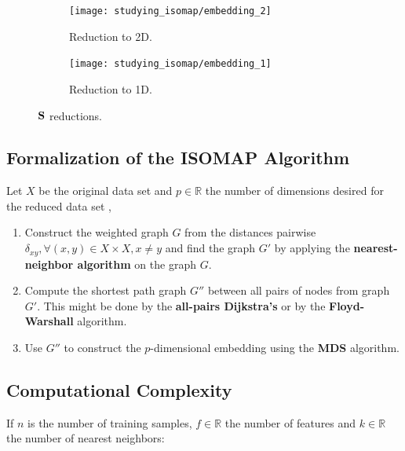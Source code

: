 \begin{figure}[H]
    \begin{subfigure}{.5\linewidth}
		\centering
		\captionsetup{justification=centering}
		\texttt{[image: studying\_isomap/embedding\_2]}
		\caption{Reduction to 2D.}
		\label{fig:mani_s_reduced_1}
	\end{subfigure}%
	\begin{subfigure}{.5\linewidth}
		\centering
		\captionsetup{justification=centering}
		\texttt{[image: studying\_isomap/embedding\_1]}
		\caption{Reduction to 1D.}
		\label{fig:mani_s_reduced_2}
	\end{subfigure}
	\caption{$\mathbf{S}$ reductions.}
	\label{fig:mani_s_reduced}
\end{figure}

\newpage
\subsection{Formalization of the ISOMAP Algorithm}

Let $X$ be the original data set and $p \in \mathbb{R}$ the number of dimensions desired for the reduced data set \cite{ten2000},

\begin{enumerate}
	\item Construct the weighted graph $G$ from the distances pairwise $\delta_{xy}, \forall (x, y) \in X \times X, x \ne y$ and find the graph $G'$ by applying the \textbf{nearest-neighbor algorithm} on the graph $G$.

	\item Compute the shortest path graph $G''$ between all pairs of nodes from graph $G'$. This might be done by the \textbf{all-pairs Dijkstra's} or by the \textbf{Floyd-Warshall} algorithm.

	\item Use $G''$ to construct the $p$-dimensional embedding using the \textbf{MDS} algorithm.
\end{enumerate}

\subsection{Computational Complexity}
\label{sec:isocomplexity}

If $n$ is the number of training samples, $f \in \mathbb{R}$ the number of features and $k \in \mathbb{R}$ the number of nearest neighbors:

